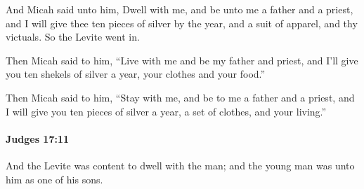 			\begin{versebox}
					\item[BHS] 
					\item[ASV] And Micah said unto him, Dwell with me, and be unto me a father and a priest, and I will give thee ten pieces of silver by the year, and a suit of apparel, and thy victuals. So the Levite went in.
					\item[NIV] Then Micah said to him, “Live with me and be my father and priest, and I’ll give you ten shekels of silver a year, your clothes and your food.”
					\item[NRSV] Then Micah said to him, “Stay with me, and be to me a father and a priest, and I will give you ten pieces of silver a year, a set of clothes, and your living.”
			\end{versebox}

		\paragraph{Judges 17:11} %
			\label{JUDGES-17-11}

			And the Levite was content to dwell with the man; and the young man was unto him as one of his sons.

